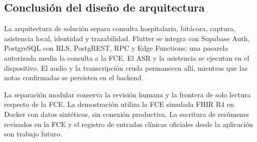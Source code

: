 \subsection{Conclusión del diseño de arquitectura}

La arquitectura de solución separa consulta hospitalaria, bitácora, captura, asistencia local, identidad y trazabilidad. Flutter se integra con Supabase Auth, PostgreSQL con RLS, PostgREST, RPC y Edge Functions; una pasarela autorizada media la consulta a la FCE. El ASR y la asistencia se ejecutan en el dispositivo. El audio y la transcripción cruda permanecen allí, mientras que las notas confirmadas se persisten en el backend.

La separación modular conserva la revisión humana y la frontera de solo lectura respecto de la FCE. La demostración utiliza la FCE simulada FHIR R4 en Docker con datos sintéticos, sin conexión productiva. La escritura de resúmenes revisados en la FCE y el registro de entradas clínicas oficiales desde la aplicación son trabajo futuro.
